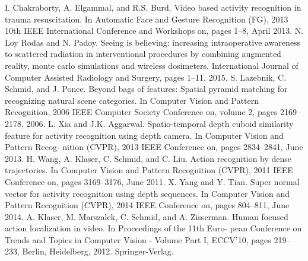 \documentclass[a4paper, 10pt, conference]{ieeeconf}      %
\begin{document}
\begin{thebibliography}{99}
I. Chakraborty, A. Elgammal, and R.S. Burd. Video based activity recognition
in trauma resuscitation. In Automatic Face and Gesture Recognition (FG), 2013
10th IEEE International Conference and Workshops on, pages 1–8, April 2013.
N. Loy Rodas and N. Padoy. Seeing is believing: increasing intraoperative awareness to scattered radiation in interventional procedures by combining augmented reality, monte carlo simulations and wireless dosimeters. International Journal of Computer Assisted Radiology and Surgery, pages 1–11, 2015. %
S. Lazebnik, C. Schmid, and J. Ponce. Beyond bags of features: Spatial pyramid
matching for recognizing natural scene categories. In Computer Vision and Pattern Recognition, 2006 IEEE Computer Society Conference on, volume 2, pages 2169–2178, 2006. %
L. Xia and J.K. Aggarwal. Spatio-temporal depth cuboid similarity feature for
activity recognition using depth camera. In Computer Vision and Pattern Recog-
nition (CVPR), 2013 IEEE Conference on, pages 2834–2841, June 2013. 
H. Wang, A. Klaser, C. Schmid, and C. Liu. Action recognition by dense
trajectories. In Computer Vision and Pattern Recognition (CVPR), 2011 IEEE
Conference on, pages 3169–3176, June 2011. %
X. Yang and Y. Tian. Super normal vector for activity recognition
using depth sequences. In Computer Vision and Pattern Recognition (CVPR),
2014 IEEE Conference on, pages 804–811, June 2014. %
A. Klaser, M. Marszalek, C. Schmid, and A. Zisserman.
Human focused action localization in video. In Proceedings of the 11th Euro-
pean Conference on Trends and Topics in Computer Vision - Volume Part I, ECCV’10, pages 219–233, Berlin, Heidelberg, 2012. Springer-Verlag. 

\end{thebibliography}
\end{document}
